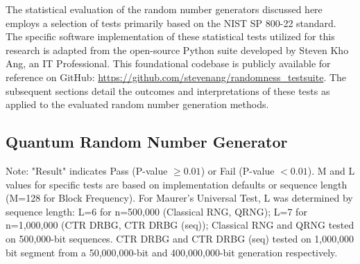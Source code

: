 The statistical evaluation of the random number generators discussed here employs a selection of tests primarily based on the NIST SP 800-22 standard. The specific software implementation of these statistical tests utilized for this research is adapted from the open-source Python suite developed by Steven Kho Ang, an IT Professional. This foundational codebase is publicly available for reference on GitHub: \url{https://github.com/stevenang/randomness_testsuite}. The subsequent sections detail the outcomes and interpretations of these tests as applied to the evaluated random number generation methods.

\subsection{Quantum Random Number Generator}

\begin{table}[htbp]
\centering
\caption{Summary of NIST SP 800-22 Rev 1a Test Results for Various RNGs ($\alpha = 0.01$)}
\label{tab:nist_results_all_rngs_final_v2} %
\begin{flushleft}
\footnotesize Note: "Result" indicates Pass (P-value $\ge 0.01$) or Fail (P-value $< 0.01$). M and L values for specific tests are based on implementation defaults or sequence length (M=128 for Block Frequency). For Maurer's Universal Test, L was determined by sequence length: L=6 for n=500,000 (Classical RNG, QRNG); L=7 for n=1,000,000 (CTR DRBG, CTR DRBG (seq)); Classical RNG and QRNG tested on 500,000-bit sequences. CTR DRBG and CTR DRBG (seq) tested on 1,000,000 bit segment from a 50,000,000-bit and 400,000,000-bit generation respectively.
\end{flushleft}
\end{table}


